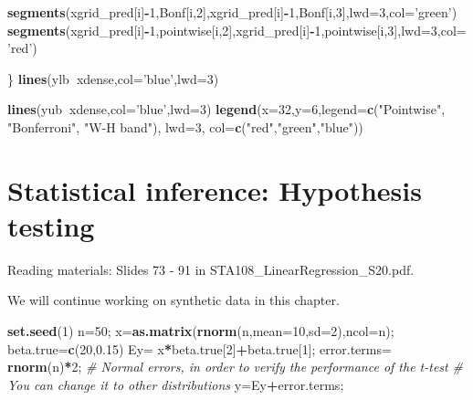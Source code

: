 \documentclass[12pt,]{book}
\newenvironment{Shaded}{\begin{snugshade}}{\end{snugshade}}
\newcommand{\KeywordTok}[1]{\textcolor[rgb]{0.13,0.29,0.53}{\textbf{#1}}}
\newcommand{\DataTypeTok}[1]{\textcolor[rgb]{0.13,0.29,0.53}{#1}}
\newcommand{\DecValTok}[1]{\textcolor[rgb]{0.00,0.00,0.81}{#1}}
\newcommand{\FloatTok}[1]{\textcolor[rgb]{0.00,0.00,0.81}{#1}}
\newcommand{\StringTok}[1]{\textcolor[rgb]{0.31,0.60,0.02}{#1}}
\newcommand{\CommentTok}[1]{\textcolor[rgb]{0.56,0.35,0.01}{\textit{#1}}}
\newcommand{\OperatorTok}[1]{\textcolor[rgb]{0.81,0.36,0.00}{\textbf{#1}}}
\newcommand{\NormalTok}[1]{#1}
\begin{document}
\begin{Shaded}
\begin{Highlighting}[]
\KeywordTok{segments}\NormalTok{(xgrid_pred[i]}\OperatorTok{-}\DecValTok{1}\NormalTok{,Bonf[i,}\DecValTok{2}\NormalTok{],xgrid_pred[i]}\OperatorTok{-}\DecValTok{1}\NormalTok{,Bonf[i,}\DecValTok{3}\NormalTok{],}\DataTypeTok{lwd=}\DecValTok{3}\NormalTok{,}\DataTypeTok{col=}\StringTok{'green'}\NormalTok{)}
\KeywordTok{segments}\NormalTok{(xgrid_pred[i]}\OperatorTok{-}\DecValTok{1}\NormalTok{,pointwise[i,}\DecValTok{2}\NormalTok{],xgrid_pred[i]}\OperatorTok{-}\DecValTok{1}\NormalTok{,pointwise[i,}\DecValTok{3}\NormalTok{],}\DataTypeTok{lwd=}\DecValTok{3}\NormalTok{,}\DataTypeTok{col=}\StringTok{'red'}\NormalTok{)}

\NormalTok{\}}
\KeywordTok{lines}\NormalTok{(ylb}\OperatorTok{~}\NormalTok{xdense,}\DataTypeTok{col=}\StringTok{'blue'}\NormalTok{,}\DataTypeTok{lwd=}\DecValTok{3}\NormalTok{)}

\KeywordTok{lines}\NormalTok{(yub}\OperatorTok{~}\NormalTok{xdense,}\DataTypeTok{col=}\StringTok{'blue'}\NormalTok{,}\DataTypeTok{lwd=}\DecValTok{3}\NormalTok{)}
\KeywordTok{legend}\NormalTok{(}\DataTypeTok{x=}\DecValTok{32}\NormalTok{,}\DataTypeTok{y=}\DecValTok{6}\NormalTok{,}\DataTypeTok{legend=}\KeywordTok{c}\NormalTok{(}\StringTok{"Pointwise"}\NormalTok{, }\StringTok{"Bonferroni"}\NormalTok{, }\StringTok{"W-H band"}\NormalTok{), }\DataTypeTok{lwd=}\DecValTok{3}\NormalTok{, }\DataTypeTok{col=}\KeywordTok{c}\NormalTok{(}\StringTok{"red"}\NormalTok{,}\StringTok{"green"}\NormalTok{,}\StringTok{"blue"}\NormalTok{))}
\end{Highlighting}
\end{Shaded}

\chapter{Statistical inference: Hypothesis testing}\label{ch:test}

Reading materials: Slides 73 - 91 in STA108\_LinearRegression\_S20.pdf.

We will continue working on synthetic data in this chapter.

\begin{Shaded}
\begin{Highlighting}[]
\KeywordTok{set.seed}\NormalTok{(}\DecValTok{1}\NormalTok{)}
\NormalTok{n=}\DecValTok{50}\NormalTok{;}
\NormalTok{x=}\KeywordTok{as.matrix}\NormalTok{(}\KeywordTok{rnorm}\NormalTok{(n,}\DataTypeTok{mean=}\DecValTok{10}\NormalTok{,}\DataTypeTok{sd=}\DecValTok{2}\NormalTok{),}\DataTypeTok{ncol=}\NormalTok{n);}
\NormalTok{beta.true=}\KeywordTok{c}\NormalTok{(}\DecValTok{20}\NormalTok{,}\FloatTok{0.15}\NormalTok{)}
\NormalTok{Ey=}\StringTok{ }\NormalTok{x}\OperatorTok{*}\NormalTok{beta.true[}\DecValTok{2}\NormalTok{]}\OperatorTok{+}\NormalTok{beta.true[}\DecValTok{1}\NormalTok{];}
\NormalTok{error.terms=}\StringTok{ }\KeywordTok{rnorm}\NormalTok{(n)}\OperatorTok{*}\DecValTok{2}\NormalTok{; }\CommentTok{# Normal errors, in order to verify the performance of the t-test }
\CommentTok{# You can change it to other distributions }
\NormalTok{y=Ey}\OperatorTok{+}\NormalTok{error.terms;}
\end{Highlighting}
\end{Shaded}
\end{document}
